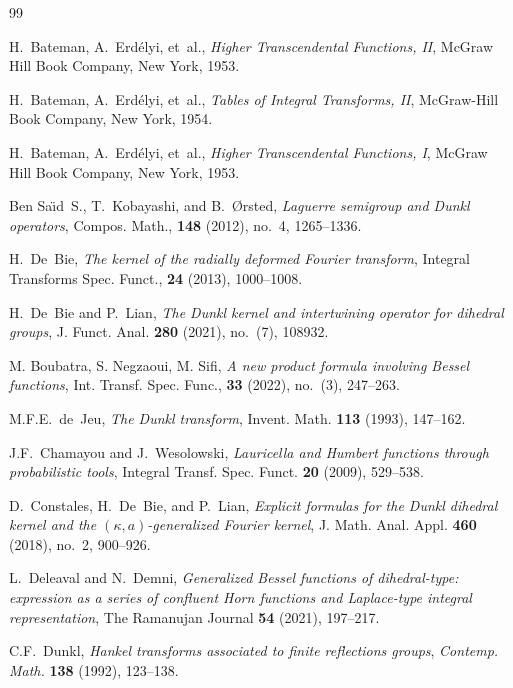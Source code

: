 \documentclass[12pt,twoside,reqno]{amsart}\usepackage[cp1251]{inputenc}
\theoremstyle{plain}
\theoremstyle{remark}
\begin{document}
\vspace{0.5cm}
\begin{thebibliography}{99}





H.~Bateman, A.~Erd\'elyi, et~al., \textit{Higher Transcendental
Functions, II}, McGraw Hill Book Company, New York, 1953.

H.~Bateman, A.~Erd\'elyi, et~al., \textit{Tables of Integral Transforms, II}, McGraw-Hill Book
Company, New York, 1954.

H.~Bateman, A.~Erd\'elyi, et~al., \textit{Higher Transcendental Functions, I},
McGraw Hill Book Company, New York, 1953.

Ben Sa\"{\i}d~S., T.~Kobayashi, and B.~{\O}rsted, \textit{Laguerre semigroup
and Dunkl operators}, Compos. Math., \textbf{148} (2012), no.~4, 1265--1336.

H.~De~Bie, \textit{The kernel of the radially deformed Fourier transform},
Integral Transforms Spec. Funct., \textbf{24} (2013), 1000--1008.

H.~De~Bie and P.~Lian, \textit{The Dunkl kernel and intertwining operator for
dihedral groups}, J. Funct. Anal. \textbf{280} (2021), no.~(7), 108932.


M. Boubatra, S. Negzaoui, M. Sifi,
\textit{ A new product formula involving Bessel functions}, Int. Transf. Spec. Func.,  \textbf{33} (2022), no.~(3), 247--263.


M.F.E.~de~Jeu, \textit{The Dunkl transform}, Invent. Math. \textbf{113} (1993), 147--162.


J.F.~Chamayou and J.~Wesolowski, \textit{Lauricella and Humbert functions
through probabilistic tools}, Integral Transf. Spec. Funct. \textbf{20} (2009),
529--538.

D.~Constales, H.~De~Bie, and P.~Lian, \textit{Explicit formulas for the Dunkl
dihedral kernel and the $(\kappa,a)$-generalized  Fourier kernel}, J. Math.
Anal. Appl. \textbf{460} (2018), no.~2, 900--926.

L.~Deleaval and N.~Demni, \textit{Generalized Bessel functions of
dihedral-type: expression as a series of confluent Horn functions and
Laplace-type integral representation}, The Ramanujan Journal \textbf{54}
(2021), 197--217.


C.F.~Dunkl, \textit{Hankel transforms associated to finite reflections groups},
\textit{Contemp. Math.} \textbf{138} (1992), 123--138.


\end{thebibliography}
\end{document}
